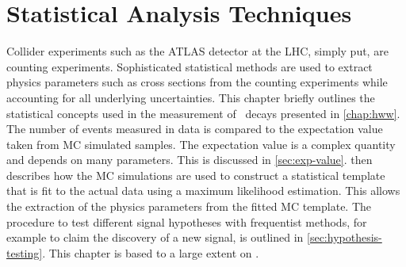 \chapter{Statistical Analysis Techniques}
\label{chap:statistics}
Collider experiments such as the ATLAS detector at the LHC, simply put, are counting experiments. 
Sophisticated statistical methods are used to extract physics parameters such as cross sections from the counting experiments while accounting for all underlying uncertainties. 
This chapter briefly outlines the statistical concepts used in the measurement of \HWW\ decays presented in \cref{chap:hww}.
The number of events measured in data is compared to the expectation value taken from MC simulated samples. The expectation value is a complex quantity and depends on many parameters. This is discussed in \cref{sec:exp-value}.
 then describes how the MC simulations are used to construct a statistical template that is fit to the actual data using a maximum likelihood estimation. This allows the extraction of the physics parameters from the fitted MC template.
The procedure to test different signal hypotheses with frequentist methods, for example to claim the discovery of a new signal, is outlined in \cref{sec:hypothesis-testing}.
This chapter is based to a large extent on .

